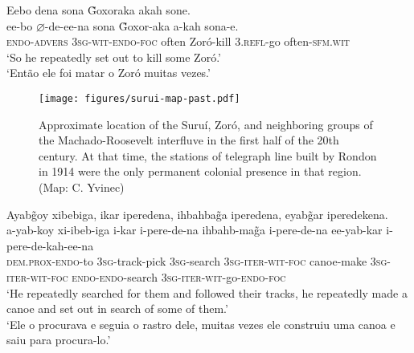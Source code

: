 \documentclass[output=paper,
modfonts,nonflat
]{langsci/langscibook}
\begin{document}
\newpage 
\ea Eebo dena sona \~{G}oxoraka akah sone.\\[.3em]
\gll ee-bo \(\varnothing\)-de-ee-na sona \~{G}oxor-aka a-kah sona-e.\\
\textsc{endo-advers} \textsc{3sg-wit-endo-foc} often Zoró-kill \textsc{3.refl}-go often-\textsc{sfm.wit}\\
\glt ‘So he repeatedly set out to kill some Zoró.’\\
\glt ‘Então ele foi matar o Zoró muitas vezes.’\\
\z

\begin{figure}[b]
\texttt{[image: figures/surui-map-past.pdf]}
\caption{Approximate location of the Suruí, Zoró, and neighboring groups of the Machado-Roosevelt interfluve in the first half of the 20th century. At that time, the stations of telegraph line built by Rondon in 1914 were the only permanent colonial presence in that region. (Map: C. Yvinec)}
\label{fig:surui:3}
\end{figure}

\newpage 
\ea Ayab\~{g}oy xibebiga, ikar iperedena, ihbahba\~{g}a iperedena, eyab\~{g}ar iperedekena.\\[.3em]
\gll a-yab-koy xi-ibeb-iga i-kar i-pere-de-na ihbahb-ma\~{g}a i-pere-de-na ee-yab-kar i-pere-de-kah-ee-na\\
\textsc{dem.prox-endo}-to \textsc{3sg}-track-pick \textsc{3sg}-search \textsc{3sg-iter-wit-foc} canoe-make \textsc{3sg-iter-wit-foc} \textsc{endo-endo}-search \textsc{3sg-iter-wit}-go-\textsc{endo-foc}\\
\glt ‘He repeatedly searched for them and followed their tracks, he repeatedly made a canoe and set out in search of some of them.’{\footnotemark}\\
\glt ‘Ele o procurava e seguia o rastro dele, muitas vezes ele construiu uma canoa e saiu para procura-lo.’\\
\z
\end{document}
